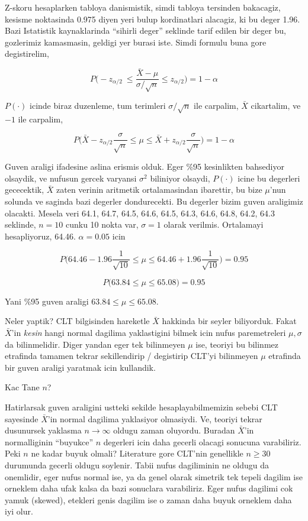 \documentclass[12pt,fleqn]{article}\usepackage{../common}
\begin{document}
Z-skoru hesaplarken tabloya danismistik, simdi tabloya tersinden bakacagiz,
kesisme noktasinda 0.975 diyen yeri bulup kordinatlari alacagiz, ki bu
deger 1.96. Bazi Istatistik kaynaklarinda ``sihirli deger'' seklinde tarif
edilen bir deger bu, gozlerimiz kamasmasin, geldigi yer burasi iste. Simdi
formulu buna gore degistirelim,

$$ 
P \bigg( 
-z_{\alpha/2} \
\le \frac{\bar{X} - \mu}{\sigma / \sqrt{n}} 
\le z_{\alpha/2}
\bigg) = 1-\alpha
 $$

$P(\cdot)$ icinde biraz duzenleme, tum terimleri $\sigma / \sqrt{n}$ ile
carpalim, $\bar{X}$ cikartalim, ve $-1$ ile carpalim,

$$ 
P \bigg( 
\bar{X} - z_{\alpha/2}\frac{\sigma}{\sqrt{n}}
\le \mu
\le \bar{X} + z_{\alpha/2}\frac{\sigma}{\sqrt{n}}
\bigg) = 1-\alpha
 $$

Guven araligi ifadesine aslina erismis olduk. Eger \%95 kesinlikten
bahsediyor olsaydik, ve nufusun gercek varyansi $\sigma^2$ biliniyor
olsaydi, $P(\cdot)$ icine bu degerleri gececektik, $\bar{X}$ zaten verinin
aritmetik ortalamasindan ibarettir, bu bize $\mu$'nun solunda ve saginda
bazi degerler dondurecekti. Bu degerler bizim guven araligimiz
olacakti. Mesela veri 64.1, 64.7, 64.5, 64.6, 64.5, 64.3, 64.6, 64.8,
64.2, 64.3 seklinde, $n=10$ cunku 10 nokta var, $\sigma = 1$ olarak
verilmis.  Ortalamayi hesapliyoruz, 64.46. $\alpha=0.05$ icin

$$ 
P \bigg( 
64.46 - 1.96\frac{1}{\sqrt{10}}
\le \mu
\le 64.46 + 1.96\frac{1}{\sqrt{10}}
\bigg) = 0.95
 $$

$$ P\bigg(63.84 \le \mu \le 65.08\bigg) = 0.95 $$

Yani \%95 guven araligi $63.84 \le \mu \le 65.08$. 

Neler yaptik? CLT bilgisinden hareketle $\bar{X}$ hakkinda bir seyler
biliyorduk. Fakat $\bar{X}$'in {\em kesin} hangi normal dagilima
yaklastigini bilmek icin nufus paremetreleri $\mu,\sigma$ da
bilinmelidir. Diger yandan eger tek bilinmeyen $\mu$ ise, teoriyi bu
bilinmez etrafinda tamamen tekrar sekillendirip / degistirip CLT'yi
bilinmeyen $\mu$ etrafinda bir guven araligi yaratmak icin kullandik.

Kac Tane $n$?

Hatirlarsak guven araligini ustteki sekilde hesaplayabilmemizin sebebi CLT
sayesinde $\bar{X}$'in normal dagilima yaklasiyor olmasiydi. Ve, teoriyi
tekrar dusunursek yaklasma $n \to \infty$ oldugu zaman oluyordu. Buradan
$\bar{X}$'in normalliginin ``buyukce'' $n$ degerleri icin daha gecerli
olacagi sonucuna varabiliriz. Peki $n$ ne kadar buyuk olmali?  Literature
gore CLT'nin genellikle $n \ge 30$ durumunda gecerli oldugu soylenir. Tabii
nufus dagiliminin ne oldugu da onemlidir, eger nufus normal ise, ya da
genel olarak simetrik tek tepeli dagilim ise orneklem daha ufak kalsa da
bazi sonuclara varabiliriz. Eger nufus dagilimi cok yamuk (skewed),
etekleri genis dagilim ise o zaman daha buyuk orneklem daha iyi olur.
\end{document}
